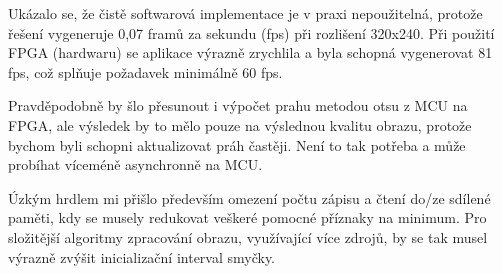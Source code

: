 \documentclass[12pt,a4paper,titlepage,final]{report}
\begin{document}
Ukázalo se, že čistě softwarová implementace je v praxi nepoužitelná, protože řešení vygeneruje 0,07 framů za sekundu (fps) při rozlišení 320x240. Při použití FPGA (hardwaru) se aplikace výrazně zrychlila a byla schopná vygenerovat 81 fps, což splňuje požadavek minimálně 60 fps.

Pravděpodobně by šlo přesunout i výpočet prahu metodou otsu z MCU na FPGA, ale výsledek by to mělo pouze na výslednou kvalitu obrazu, protože bychom byli schopni aktualizovat práh častěji. Není to tak potřeba a může probíhat víceméně asynchronně na MCU.

Úzkým hrdlem mi přišlo především omezení počtu zápisu a čtení do/ze sdílené paměti, kdy se musely redukovat veškeré pomocné příznaky na minimum. Pro složitější algoritmy zpracování obrazu, využívající více zdrojů, by se tak musel výrazně zvýšit inicializační interval smyčky.
\end{document}
